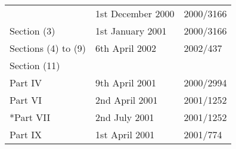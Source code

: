 \documentclass[12pt,a4paper]{article}
\begin{document}
{\begin{longtable}{p{194.81242pt}p{92.22098pt}p{43.81pt}}
	&1st December 2000	&2000/3166\\
\hspace{2em}Section (3)	&1st January 2001	&2000/3166\\
\hspace{2em}Sections (4) to (9)	&6th April 2002	&2002/437\\
\hspace{2em}Section (11)		\\
\hspace{1em}Part IV	&9th April 2001	&2000/2994\\
\hspace{1em}Part VI	&2nd April 2001	&2001/1252\\
\hspace{1em}*Part VII	&2nd July 2001	&2001/1252\\
\hspace{1em}Part IX	&1st April 2001	&2001/774\\
\end{longtable}

}
\end{document}
